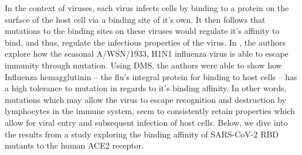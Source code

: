 \documentclass{article}
\begin{document}
In the context of viruses, each virus infects cells by binding to a protein on the surface of the host cell via a binding site of it's own.
It then follows that mutations to the binding sites on these viruses would regulate it's affinity to bind, and thus, regulate the infectious properties of the virus.
In \citet{Bloom2014}, the authors explore how the seasonal A/WSN/1933, H1N1 influenza virus is able to escape immunity through mutation.
Using DMS, the authors were able to show how Influenza hemagglutinin -- the flu's integral protein for binding to host cells -- has a high tolerance to mutation in regards to it's binding affinity.
In other words, mutations which may allow the virus to escape recognition and destruction by lymphocytes in the immune system, seem to consistently retain properties which allow for viral entry and subsequent infection of host cells.
Below, we dive into the results from a study exploring the binding affinity of SARS-CoV-2 RBD mutants to the human ACE2 receptor.
\end{document}

